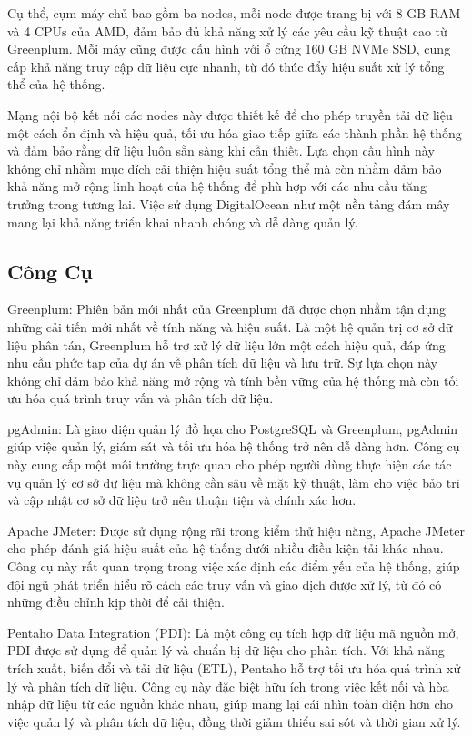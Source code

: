 \documentclass[14pt]{article}
\begin{document}
Cụ thể, cụm máy chủ bao gồm ba nodes, mỗi node được trang bị với 8 GB RAM và 4 CPUs của AMD, đảm bảo đủ khả năng xử lý các yêu cầu kỹ thuật cao từ Greenplum. Mỗi máy cũng được cấu hình với ổ cứng 160 GB NVMe SSD, cung cấp khả năng truy cập dữ liệu cực nhanh, từ đó thúc đẩy hiệu suất xử lý tổng thể của hệ thống.

Mạng nội bộ kết nối các nodes này được thiết kế để cho phép truyền tải dữ liệu một cách ổn định và hiệu quả, tối ưu hóa giao tiếp giữa các thành phần hệ thống và đảm bảo rằng dữ liệu luôn sẵn sàng khi cần thiết. Lựa chọn cấu hình này không chỉ nhằm mục đích cải thiện hiệu suất tổng thể mà còn nhằm đảm bảo khả năng mở rộng linh hoạt của hệ thống để phù hợp với các nhu cầu tăng trưởng trong tương lai. Việc sử dụng DigitalOcean như một nền tảng đám mây mang lại khả năng triển khai nhanh chóng và dễ dàng quản lý.



\subsection{Công Cụ}

Greenplum: Phiên bản mới nhất của Greenplum đã được chọn nhằm tận dụng những cải tiến mới nhất về tính năng và hiệu suất. Là một hệ quản trị cơ sở dữ liệu phân tán, Greenplum hỗ trợ xử lý dữ liệu lớn một cách hiệu quả, đáp ứng nhu cầu phức tạp của dự án về phân tích dữ liệu và lưu trữ. Sự lựa chọn này không chỉ đảm bảo khả năng mở rộng và tính bền vững của hệ thống mà còn tối ưu hóa quá trình truy vấn và phân tích dữ liệu.

pgAdmin: Là giao diện quản lý đồ họa cho PostgreSQL và Greenplum, pgAdmin giúp việc quản lý, giám sát và tối ưu hóa hệ thống trở nên dễ dàng hơn. Công cụ này cung cấp một môi trường trực quan cho phép người dùng thực hiện các tác vụ quản lý cơ sở dữ liệu mà không cần sâu về mặt kỹ thuật, làm cho việc bảo trì và cập nhật cơ sở dữ liệu trở nên thuận tiện và chính xác hơn.

Apache JMeter: Được sử dụng rộng rãi trong kiểm thử hiệu năng, Apache JMeter cho phép đánh giá hiệu suất của hệ thống dưới nhiều điều kiện tải khác nhau. Công cụ này rất quan trọng trong việc xác định các điểm yếu của hệ thống, giúp đội ngũ phát triển hiểu rõ cách các truy vấn và giao dịch được xử lý, từ đó có những điều chỉnh kịp thời để cải thiện.

Pentaho Data Integration (PDI): Là một công cụ tích hợp dữ liệu mã nguồn mở, PDI được sử dụng để quản lý và chuẩn bị dữ liệu cho phân tích. Với khả năng trích xuất, biến đổi và tải dữ liệu (ETL), Pentaho hỗ trợ tối ưu hóa quá trình xử lý và phân tích dữ liệu. Công cụ này đặc biệt hữu ích trong việc kết nối và hòa nhập dữ liệu từ các nguồn khác nhau, giúp mang lại cái nhìn toàn diện hơn cho việc quản lý và phân tích dữ liệu, đồng thời giảm thiểu sai sót và thời gian xử lý.
\end{document}
